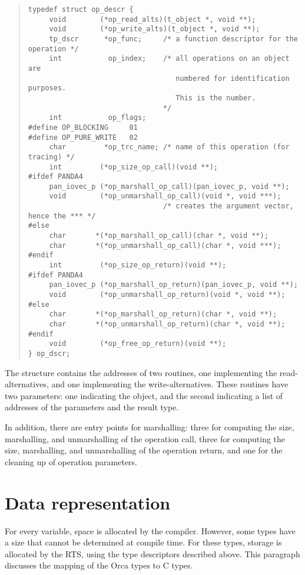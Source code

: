 \documentclass[10pt]{article}
\begin{document}
\begin{quote}
\begin{verbatim}
typedef struct op_descr {
     void        (*op_read_alts)(t_object *, void **);
     void        (*op_write_alts)(t_object *, void **);
     tp_dscr      *op_func;     /* a function descriptor for the operation */
     int           op_index;    /* all operations on an object are
                                   numbered for identification purposes.
                                   This is the number.
                                */
     int           op_flags;
#define OP_BLOCKING     01
#define OP_PURE_WRITE   02
     char         *op_trc_name;	/* name of this operation (for tracing) */
     int         (*op_size_op_call)(void **);
#ifdef PANDA4
     pan_iovec_p (*op_marshall_op_call)(pan_iovec_p, void **);
     void        (*op_unmarshall_op_call)(void *, void ***);
                                /* creates the argument vector, hence the *** */
#else
     char       *(*op_marshall_op_call)(char *, void **);
     char       *(*op_unmarshall_op_call)(char *, void ***);
#endif
     int         (*op_size_op_return)(void **);
#ifdef PANDA4
     pan_iovec_p (*op_marshall_op_return)(pan_iovec_p, void **);
     void        (*op_unmarshall_op_return)(void *, void **);
#else
     char       *(*op_marshall_op_return)(char *, void **);
     char       *(*op_unmarshall_op_return)(char *, void **);
#endif
     void        (*op_free_op_return)(void **);
} op_dscr;
\end{verbatim}
\end{quote}
The structure contains the addresses of two routines, one implementing the
read-alternatives, and one implementing the write-alternatives.
These routines have two parameters: one indicating the object, and the second
indicating a list of addresses of the parameters and the result type.

In addition, there are entry points for marshalling: three for 
computing the size, marshalling, and unmarshalling of the operation call,
three for computing the size, marshalling, and unmarshalling of the operation
return, and one for the cleaning up of operation parameters.

\section{Data representation}\label{sec:mapping}
For every variable, space is allocated by the compiler.
However, some types have a size that cannot be determined at compile time.
For these types, storage is allocated by the RTS, using the
type descriptors described above.
This paragraph discusses the mapping of the Orca types to C types.
\end{document}
